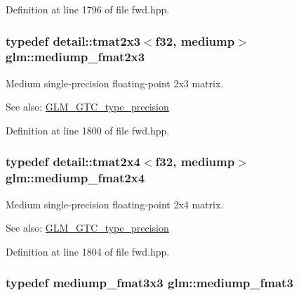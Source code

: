 Definition at line 1796 of file fwd.hpp.\hypertarget{group__gtc__type__precision_gae7081e19f495e7cdbf727e1550b95a8}{
\subsubsection[mediump\_\-fmat2x3]{\setlength{\rightskip}{0pt plus 5cm}typedef detail::tmat2x3$<$f32, mediump$>$ {\bf glm::mediump\_\-fmat2x3}}}
\label{group__gtc__type__precision_gae7081e19f495e7cdbf727e1550b95a8}


Medium single-precision floating-point 2x3 matrix. \begin{Desc}
\item[See also:]\hyperlink{group__gtc__type__precision}{GLM\_\-GTC\_\-type\_\-precision} \end{Desc}


Definition at line 1800 of file fwd.hpp.\hypertarget{group__gtc__type__precision_g8f793d90a5a6bea23c13ad195fcb5de2}{
\subsubsection[mediump\_\-fmat2x4]{\setlength{\rightskip}{0pt plus 5cm}typedef detail::tmat2x4$<$f32, mediump$>$ {\bf glm::mediump\_\-fmat2x4}}}
\label{group__gtc__type__precision_g8f793d90a5a6bea23c13ad195fcb5de2}


Medium single-precision floating-point 2x4 matrix. \begin{Desc}
\item[See also:]\hyperlink{group__gtc__type__precision}{GLM\_\-GTC\_\-type\_\-precision} \end{Desc}


Definition at line 1804 of file fwd.hpp.\hypertarget{group__gtc__type__precision_g85f2267401434ea8c5463af040f0760c}{
\subsubsection[mediump\_\-fmat3]{\setlength{\rightskip}{0pt plus 5cm}typedef mediump\_\-fmat3x3 {\bf glm::mediump\_\-fmat3}}}
\label{group__gtc__type__precision_g85f2267401434ea8c5463af040f0760c}



